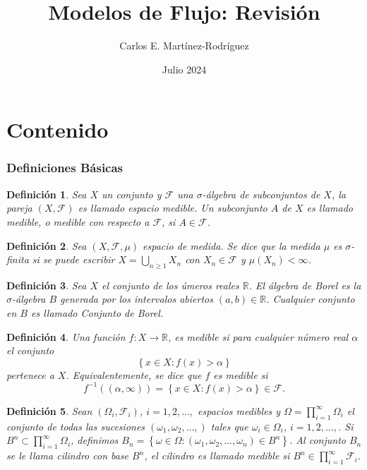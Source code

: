 \documentclass{article}
\title{Modelos de Flujo: Revisi\'on}
\author{Carlos E. Martínez-Rodríguez}
\date{Julio 2024}
\newtheorem{Def}{Definición}
\newcommand{\rea}{\mathbb{R}}
\begin{document}
\maketitle

\tableofcontents
\part{Contenido}

\section{Definiciones  B\'asicas}
\begin{Def}
Sea $X$ un conjunto y $\mathcal{F}$ una $\sigma$-\'algebra de subconjuntos de $X$, la pareja $\left(X,\mathcal{F}\right)$ es llamado espacio medible. Un subconjunto $A$ de $X$ es llamado medible, o medible con respecto a $\mathcal{F}$, si $A\in\mathcal{F}$.
\end{Def}

\begin{Def}
Sea $\left(X,\mathcal{F},\mu\right)$ espacio de medida. Se dice que la medida $\mu$ es $\sigma$-finita si se puede escribir $X=\bigcup_{n\geq1}X_{n}$ con $X_{n}\in\mathcal{F}$ y $\mu\left(X_{n}\right)<\infty$.
\end{Def}

\begin{Def}\label{Cto.Borel}
Sea $X$ el conjunto de los \'umeros reales $\rea$. El \'algebra de Borel es la $\sigma$-\'algebra $B$ generada por los intervalos abiertos $\left(a,b\right)\in\rea$. Cualquier conjunto en $B$ es llamado {\em Conjunto de Borel}.
\end{Def}

\begin{Def}\label{Funcion.Medible}
Una funci\'on $f:X\rightarrow\rea$, es medible si para cualquier n\'umero real $\alpha$ el conjunto \[\left\{x\in X:f\left(x\right)>\alpha\right\}\] pertenece a $X$. Equivalentemente, se dice que $f$ es medible si \[f^{-1}\left(\left(\alpha,\infty\right)\right)=\left\{x\in X:f\left(x\right)>\alpha\right\}\in\mathcal{F}.\]
\end{Def}


\begin{Def}\label{Def.Cilindros}
Sean $\left(\Omega_{i},\mathcal{F}_{i}\right)$, $i=1,2,\ldots,$ espacios medibles y $\Omega=\prod_{i=1}^{\infty}\Omega_{i}$ el conjunto de todas las sucesiones $\left(\omega_{1},\omega_{2},\ldots,\right)$ tales que $\omega_{i}\in\Omega_{i}$, $i=1,2,\ldots,$. Si $B^{n}\subset\prod_{i=1}^{\infty}\Omega_{i}$, definimos $B_{n}=\left\{\omega\in\Omega:\left(\omega_{1},\omega_{2},\ldots,\omega_{n}\right)\in B^{n}\right\}$. Al conjunto $B_{n}$ se le llama {\em cilindro} con base $B^{n}$, el cilindro es llamado medible si $B^{n}\in\prod_{i=1}^{\infty}\mathcal{F}_{i}$.
\end{Def}
\end{document}
